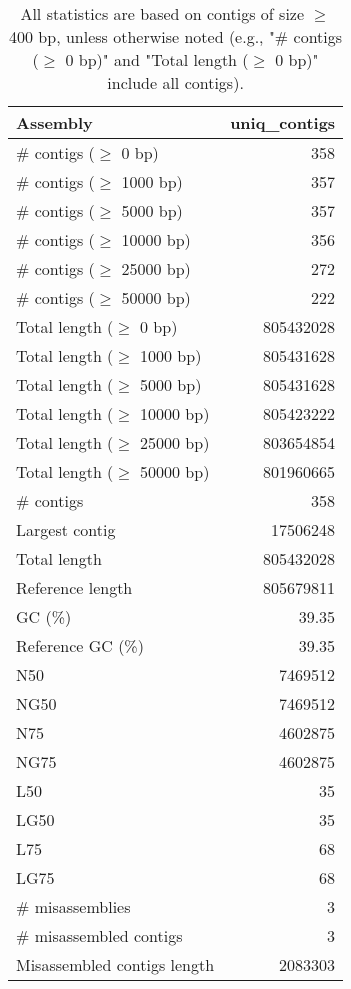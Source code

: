 \documentclass[12pt,a4paper]{article}
\begin{document}
\begin{table}[ht]
\begin{center}
\caption{All statistics are based on contigs of size $\geq$ 400 bp, unless otherwise noted (e.g., "\# contigs ($\geq$ 0 bp)" and "Total length ($\geq$ 0 bp)" include all contigs).}
\begin{tabular}{|l*{1}{|r}|}
\hline
Assembly & uniq\_contigs \\ \hline
\# contigs ($\geq$ 0 bp) & 358 \\ \hline
\# contigs ($\geq$ 1000 bp) & 357 \\ \hline
\# contigs ($\geq$ 5000 bp) & 357 \\ \hline
\# contigs ($\geq$ 10000 bp) & 356 \\ \hline
\# contigs ($\geq$ 25000 bp) & 272 \\ \hline
\# contigs ($\geq$ 50000 bp) & 222 \\ \hline
Total length ($\geq$ 0 bp) & 805432028 \\ \hline
Total length ($\geq$ 1000 bp) & 805431628 \\ \hline
Total length ($\geq$ 5000 bp) & 805431628 \\ \hline
Total length ($\geq$ 10000 bp) & 805423222 \\ \hline
Total length ($\geq$ 25000 bp) & 803654854 \\ \hline
Total length ($\geq$ 50000 bp) & 801960665 \\ \hline
\# contigs & 358 \\ \hline
Largest contig & 17506248 \\ \hline
Total length & 805432028 \\ \hline
Reference length & 805679811 \\ \hline
GC (\%) & 39.35 \\ \hline
Reference GC (\%) & 39.35 \\ \hline
N50 & 7469512 \\ \hline
NG50 & 7469512 \\ \hline
N75 & 4602875 \\ \hline
NG75 & 4602875 \\ \hline
L50 & 35 \\ \hline
LG50 & 35 \\ \hline
L75 & 68 \\ \hline
LG75 & 68 \\ \hline
\# misassemblies & 3 \\ \hline
\# misassembled contigs & 3 \\ \hline
Misassembled contigs length & 2083303 \\ \hline

\end{tabular}
\end{center}
\end{table}
\end{document}
